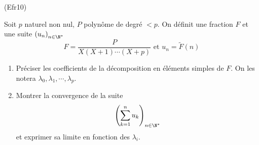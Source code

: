 \begin{tiny}(Efr10)\end{tiny} Soit $p$ naturel non nul, $P$ polynôme de degré $<p$. On définit une fraction $F$ et une suite $\left( u_n\right)_{n\in \N^*}$
\begin{displaymath}
  F = \frac{P}{X(X+1)\cdots(X+p)} \text{ et } u_n = \widetilde{F}(n)
\end{displaymath}
\begin{enumerate}
  \item Préciser les coefficients de la décomposition en éléments simples de $F$. On les notera $\lambda_0, \lambda_1, \cdots, \lambda_p$.
  \item Montrer la convergence de la suite
\begin{displaymath}
  \left( \sum_{k=1}^{n}u_k\right)_{n\in \N^*} 
\end{displaymath}
et exprimer sa limite en fonction des $\lambda_i$.
\end{enumerate}
